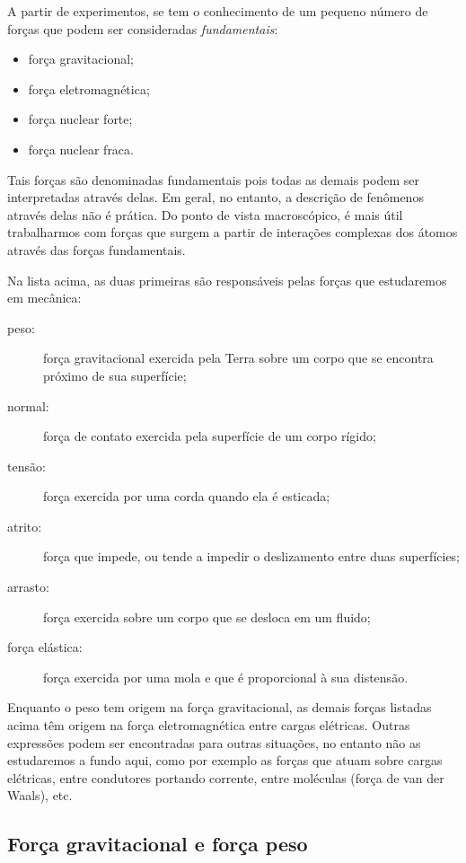 A partir de experimentos, se tem o conhecimento de um pequeno número de forças que podem ser consideradas \emph{fundamentais}:
\begin{itemize}
  \item força gravitacional;
  \item força eletromagnética;
  \item força nuclear forte;
  \item força nuclear fraca.
\end{itemize}
%
Tais forças são denominadas fundamentais pois todas as demais podem ser interpretadas através delas. Em geral, no entanto, a descrição de fenômenos através delas não é prática. Do ponto de vista macroscópico, é mais útil trabalharmos com forças que surgem a partir de interações complexas dos átomos através das forças fundamentais.

Na lista acima, as duas primeiras são responsáveis pelas forças que estudaremos em mecânica:
\begin{description}
    \item[peso:] força gravitacional exercida pela Terra sobre um corpo que se encontra próximo de sua superfície;
    \item[normal:] força de contato exercida pela superfície de um corpo rígido;
    \item[tensão:] força exercida por uma corda quando ela é esticada;
    \item[atrito:] força que impede, ou tende a impedir o deslizamento entre duas superfícies;
    \item[arrasto:] força exercida sobre um corpo que se desloca em um fluido;
    \item[força elástica:] força exercida por uma mola e que é proporcional à sua distensão.
\end{description}
%
Enquanto o peso tem origem na força gravitacional, as demais forças listadas acima têm origem na força eletromagnética entre cargas elétricas. Outras expressões podem ser encontradas para outras situações, no entanto não as estudaremos a fundo aqui, como por exemplo as forças que atuam sobre cargas elétricas, entre condutores portando corrente, entre moléculas (força de van der Waals), etc.

\subsection{Força gravitacional e força peso} 

